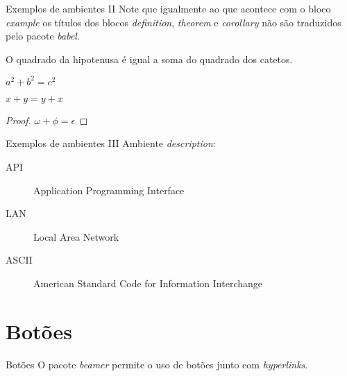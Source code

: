 \documentclass[darkblue]{beamer}
\begin{document}
		\label{amb2}
		\begin{frame}{Exemplos de ambientes II}
			Note que igualmente ao que acontece com o bloco \textit{example} os títulos dos blocos \textit{definition}, \textit{theorem} e \textit{corollary} não são traduzidos pelo pacote \textit{babel}.
			
			\begin{definition}
				O quadrado da hipotenusa é igual a soma do quadrado dos catetos. 
			\end{definition}
			
			\begin{theorem}[Pitágoras]
				$ a^2 + b^2 = c^2$
			\end{theorem}
			
			\begin{corollary}
				$ x + y = y + x  $
			\end{corollary}
			
			\begin{proof}
				$\omega +\phi = \epsilon $
			\end{proof}
		\end{frame}
		
		\begin{frame}{Exemplos de ambientes III}
			Ambiente \textit{description}:
			
			\begin{description}
				\item[API] Application Programming Interface
				\item[LAN] Local Area Network
				\item[ASCII] American Standard Code for Information Interchange
			\end{description}
		\end{frame}
		
		\section{Botões}
			\begin{frame}{Botões}
				O pacote \textit{beamer} permite o uso de botões junto com \textit{hyperlinks}.
				
				\begin{center}
					\hyperlink{amb1}{}\\
					\hyperlink{amb2}{}\\
					\hyperlink{title}{}\\
					\hyperlink{perg}{}
				\end{center}				
			\end{frame}
		
\end{document}
